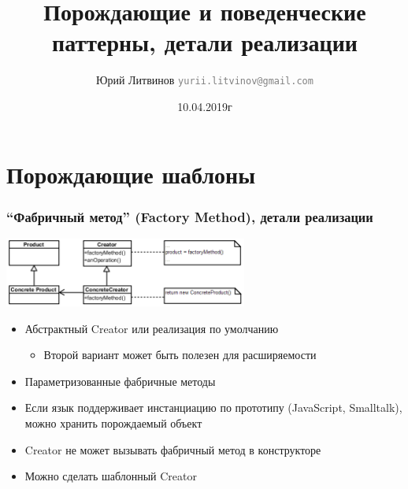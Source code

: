 \documentclass[xetex,mathserif,serif]{beamer}
\title{Порождающие и поведенческие паттерны, детали реализации}
\author[Юрий Литвинов]{Юрий Литвинов \newline \textcolor{gray}{\small\texttt{yurii.litvinov@gmail.com}}}
\date{10.04.2019г}
\begin{document}
	
	\frame{\titlepage}

	\section{Порождающие шаблоны}

	\begin{frame}
		\frametitle{``Фабричный метод'' (Factory Method), детали реализации}
		\begin{center}
			\includegraphics[width=0.6\textwidth]{factoryMethod.png}
		\end{center}
		\begin{itemize}
			\item Абстрактный Creator или реализация по умолчанию
			\begin{itemize}
				\item Второй вариант может быть полезен для расширяемости
			\end{itemize}
			\item Параметризованные фабричные методы
			\item Если язык поддерживает инстанциацию по прототипу (JavaScript, Smalltalk), можно хранить порождаемый объект
			\item Creator не может вызывать фабричный метод в конструкторе
			\item Можно сделать шаблонный Creator
		\end{itemize}
	\end{frame}
\end{document}
